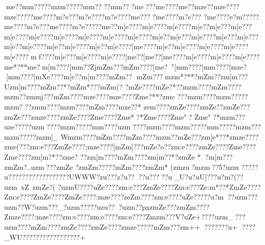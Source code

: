 {{{{{{{{{{{{{{{{{{{{{{{{{{{{{{{{{{{{{{{{{{{{{{{{{{{{{{{{{{{{{{{{{{{{{{{{{{{{{{{{{{{{{{{{{{{{{{{{{{{{{{{{{{{{{{{{{{{{{{{{{{{{{{{{{{{{{{{{{{{{{{{{{{{{{{{{{{{{{{{{{{{{{{{{{{{{{{{{{{{{{{{{{{{{{{{{{{{{{{{{{{{{{{{{{{{{{{{{{{{{{{{{{{{{{{{{{{{{{{{{{{{{{{{{{{{{{{{{{{{{{{{{{{{{{{{{{{{{{{{{{{{{{{{{{{{{{{{{{{{{{{{{{{{{{{{{{{{{{{{{{{{{{{{{{{{{{{{{{{{{{{{{{{{{{{{{{{{{{{{{{{{{{{{{{{{{{{{{{{{{{{{{{{{{{{{{{{{{{{{{{{{{{{{{{{{{{{{{{{{{{{{{{{{{{{{{{{{{{{{{{{{{{{{{{{{{{{{{{{{{{{{{{{{{{{{{{{{{{{{{{{{{{{{{{{{{{{{{{{{{{{{{{{{{{{{{{{{{{{{{{{{{{{{{{{{{{{{{{{{{{{{{{{{{{{{{{{{{{{{{{{{{{{{{{{{{{{{{{{{{{{{{{{{{{{{{{{{{{{{{{{{{{{{{{{{{{{{{{{{{{{{{{{{{{{{{{{{{{{{{{{{{{{{{{{{{{{{{{{{{{{{{{{{{{{{{{{{{{{{{{{{{{{{{{{{{{{{{{{{{{{{{{{{{{{{{{{{{{{{{{{{{{{{{{{{{{{{{{{{{{{{{{{{{{{{{{{{{{{{{{{{m{e  ? ?m{m?????mzm?????m{m????m{m???{m{e???{m{e????{m{e??{mze??{mze????{mze?????m{e????{m?e???{m?e????{m?e????{m{e??? ?m{e????{m?e???
?m{e????{e?m?????m{e????{m?e???m{e????{m?e?????m{e??{m[e????{m[e????{m[e????{m[e??{m[e???{m[e???{m[e????{m[e????{m[e????{m[e????{m[e????{m[e????{m[e??{m[e???{m[e????{m[e???{m[e???{m[e??{m[e????{m[e??{m[e????{m[e??{m[e????[m{e????{m[e??{m[e????{m[e????{m[e????{m[e????mf????{m[e???{m[e????{m[e????[m{e??[m{e??[m{e????{m[e????{m[e????{m[e????{m{e*?**{m{e?  {m[m????[m{m??Zj{mZm??? {mZm????[m{e?"[m{m????[m{m????[mze?
 [m{m????|mXe????{m[e??{m[m????{mZm??
{mZm???{mzm*?**?mZm??zm[m???Uzm[m????{mZm??*?{mZm*???{mZm(? ?{mZe????{mZe?*??{mzm????{mZm????{mzm??zm{mj???{mZm????{mze????{mze????Zm{e?**?zm{e
???{mzm????{mzm?????mzm???zm{m????{mzm????{mZm????{mze??*
ze{m????zmZe????zmZe??zmZe???zmZe???zmze????zmZe????Zm{e????Zm{e*?*Zm{e????Zm{e"?
Zm{e" ?*{mzm???uze?????uzm????mzm?????m{m????{uzm????mzm????{mzm?????m{m?????mzm???mzm?????mzm]_W{mzm????{mZm????{mZm????{mzm??}}{mZe???zm[e*??*zmze????zm{e(???zm:e???ZmZe????:mze????[mZm]???{mZe?o??zm:e????zmZe????Zm{e????Zm{e????zm[m?*??zm{e? ??zm[m????{mZm????zm[m??*?zmZe
*
?m[m???zmZm?.. {uzm???zmZe   ?zmZm?????mZm????zmZm*  (zmzu   ?mzm??5?uzm%
?????u??????}??????}??????}UWWW?}zu???z}?u???}?u????}?u_}U?u?uU]???u?m? (??uzm~xZ~zmZe?(
 ?uzmU????uZe????zm:e???ZmZe????Zm:e???Ze:m*??*ZmZe????Zm:e????ZmZe????ZmZe????:mze????zeZm????zm:e????uZe?????u?m ??uzm  ???uzm ??W?uzm???_?uzm?????uzu???uzm??pxzmZe ???zmZm????Zmze????:mze????zm:e????zm:e????zm:e????Zmzm???V?uZe+????uzm_???uzm????mZm????zmZe????zmZe????zmze?????mZm???}zm++?}?}????}?u+
 ???}?_WU???}??????}??????}??+
}}}}}}}}}}}}}}}}}}}}}}}}}}}}}}}}}}}}}}}}}}}}}}}}}}}}}}}}}}}}}}}}}}}}}}}}}}}}}}}}}}}}}}}}}}}}}}}}}}}}}}}}}}}}}}}}}}}}}}}}}}}}}}}}}}}}}}}}}}}}}}}}}}}}}}}}}}}}}}}}}}}}}}}}}}}}}}}}}}}}}}}}}}}}}}}}}}}}}}}}}}}}}}}}}}}}}}}}}}}}}}}}}}}}}}}}}}}}}}}}}}}}}}}}}}}}}}}}}}}}}}}}}}}}}}}}}}}}}}}}}}}}}}}}}}}}}}}}}}}}}}}}}}}}}}}}}}}}}}}}}}}}}}}}}}}}}}}}}}}}}}}}}}}}}}}}}}}}}}}}}}}}}}}}}}}}}}}}}}}}}}}}}}}}}}}}}}}}}}}}}}}}}}}}}}}}}}}}}}}}}}}}}}}}}}}}}}}}}}}}}}}}}}}}}}}}}}}}}}}}}}}}}}}}}}}}}}}}}}}}}}}}}}}}}}}}}}}}}}}}}}}}}}}}}}}}}}}}}}}}}}}}}}}}}}}}}}}}}}}}}}}}}}}}}}}}}}}}}}}}}}}}}}}}}}}}}}}}}}}}}}}}}}}}}}}}}}}}}}}}}}}}}}}}}}}}}}}}}}}}}}}}}}}}}}}}}}}}}}}}}}}}}}}}}}}}}}}}}}}}}}}}}}}}}}}}}}}}}}}}}}}}}}}}}}}}}}}}}}}}}}}}}}}}}}}}}}}}}}}}}}}}}}}}}}}}}}}}}}}}}}}}}}}}}}}}}}}}}}}}}}}}}}}}}}}}}}}}}}}}}}}}}}}}}}}}}}}}}}}}}}}}}}}}}}}}}}}}}}}}}}}}}}}}}}}}}}}}}}}}}}}}}}}}}}}}}}}}}}}}}}}}}}}}}}}

